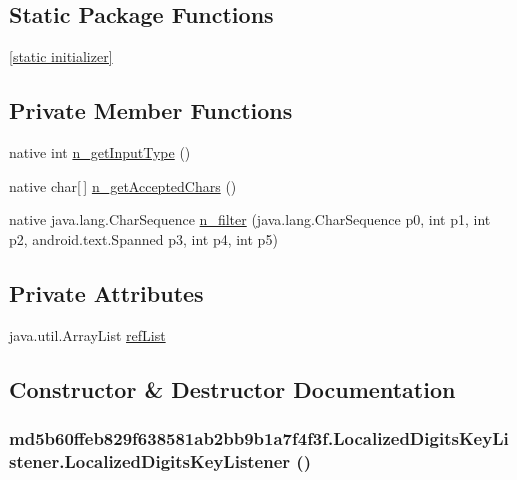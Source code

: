\subsection*{Static Package Functions}
\begin{CompactItemize}
\item 
\hyperlink{classmd5b60ffeb829f638581ab2bb9b1a7f4f3f_1_1_localized_digits_key_listener_03dc65fed57bf1f5ab89bf34c6bb7558}{\mbox{[}static initializer\mbox{]}}
\end{CompactItemize}
\subsection*{Private Member Functions}
\begin{CompactItemize}
\item 
native int \hyperlink{classmd5b60ffeb829f638581ab2bb9b1a7f4f3f_1_1_localized_digits_key_listener_8db254b30f59bb9071beef3362d9853c}{n\_\-getInputType} ()
\item 
native char\mbox{[}$\,$\mbox{]} \hyperlink{classmd5b60ffeb829f638581ab2bb9b1a7f4f3f_1_1_localized_digits_key_listener_447e661b781c672ee3f0bac3c76448af}{n\_\-getAcceptedChars} ()
\item 
native java.lang.CharSequence \hyperlink{classmd5b60ffeb829f638581ab2bb9b1a7f4f3f_1_1_localized_digits_key_listener_7d8fd81af59fcfb834b8732fdbe30352}{n\_\-filter} (java.lang.CharSequence p0, int p1, int p2, android.text.Spanned p3, int p4, int p5)
\end{CompactItemize}
\subsection*{Private Attributes}
\begin{CompactItemize}
\item 
java.util.ArrayList \hyperlink{classmd5b60ffeb829f638581ab2bb9b1a7f4f3f_1_1_localized_digits_key_listener_c8f791f7f9e40c12bcd21516e34e300d}{refList}
\end{CompactItemize}


\subsection{Constructor \& Destructor Documentation}
\hypertarget{classmd5b60ffeb829f638581ab2bb9b1a7f4f3f_1_1_localized_digits_key_listener_cf751704952ad7860713321b22d9f7a8}{
\subsubsection[{LocalizedDigitsKeyListener}]{\setlength{\rightskip}{0pt plus 5cm}md5b60ffeb829f638581ab2bb9b1a7f4f3f.LocalizedDigitsKeyListener.LocalizedDigitsKeyListener ()}}
\label{classmd5b60ffeb829f638581ab2bb9b1a7f4f3f_1_1_localized_digits_key_listener_cf751704952ad7860713321b22d9f7a8}


